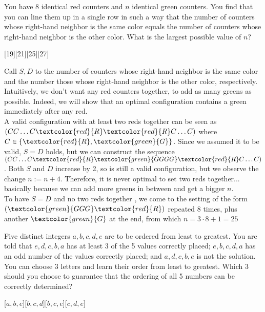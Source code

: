 \begin{problem}
    You have 8 identical red counters and $n$ identical green counters. You find that you can line them up in a single row in such a way that the number of counters whose right-hand neighbor is the same color equals the number of counters whose right-hand neighbor is the other color. What is the largest possible value of $n$?
\end{problem}
[19][21][25][27]

\begin{solution}[D]
    Call $S,D$ to the number of counters whose right-hand neighbor is the same color and the number those whose right-hand neighbor is the other color, respectively. Intuitively, we don't want any red counters together, to add as many greens as possible. Indeed, we will show that an optimal configuration contains a green immediately after any red. \\[3mm]
    A valid configuration with at least two reds together can be seen as $(CC\ldots C \textcolor{red}{R} \textcolor{red}{R} C  \ldots C)$ where $C \in \{ \textcolor{red}{R} , \textcolor{green}{G}\}$. Since we assumed it to be valid, $S=D$ holds, but we can construct the sequence $(CC\ldots C \textcolor{red}{R} \textcolor{green}{GGGG}  \textcolor{red}{R} C  \ldots C)$. Both $S$ and $D$ increase by 2, so is still a valid configuration, but we observe the change $n := n + 4$. Therefore, it is never optimal to set two reds together... basically because we can add more greens in between and get a bigger $n$. \\[3mm]
    To have $S=D$ and no two reds together , we come to the setting of the form $( \textcolor{green}{GGG} \textcolor{red}{R})$ repeated 8 times, plus another $\textcolor{green}{G}$ at the end, from which $n = 3 \cdot 8 + 1 = \boxed{25}$
\end{solution}

\begin{problem}
    Five distinct integers $a, b, c, d, e$ are to be ordered from least to greatest. You are told that $e, d, c, b, a$ has at least 3 of the 5 values correctly placed; $e, b, c, d, a$ has an odd number of the values correctly placed; and $a, d, c, b, e$ is not the solution. You can choose 3 letters and learn their order from least to greatest. Which 3 should you choose to guarantee that the ordering of all 5 numbers can be correctly determined?
\end{problem}
    [$a, b, e$][$b, c, d$][$b, c, e$][$c, d, e$]

